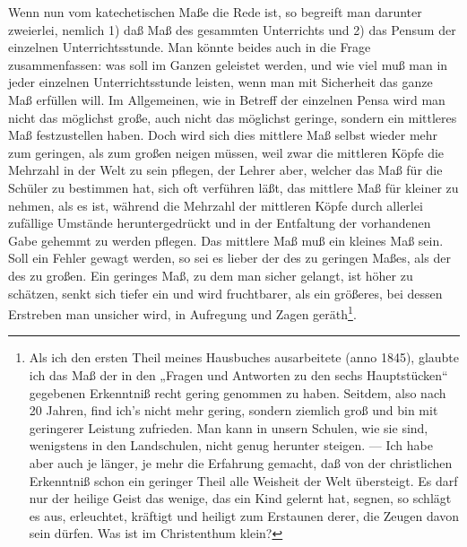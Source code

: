 Wenn nun vom katechetischen Maße die Rede ist, so begreift man darunter zweierlei, nemlich 1) daß Maß des gesammten Unterrichts und 2) das Pensum der einzelnen Unterrichtsstunde. Man könnte beides auch in die Frage zusammenfassen: was soll im Ganzen geleistet werden, und wie viel muß man in jeder einzelnen Unterrichtsstunde leisten, wenn man mit Sicherheit das ganze Maß erfüllen will. Im Allgemeinen, wie in Betreff der
einzelnen Pensa wird man nicht das möglichst große, auch nicht das möglichst geringe, sondern ein mittleres Maß festzustellen haben. Doch wird sich dies mittlere Maß selbst wieder mehr zum geringen, als zum großen neigen müssen, weil zwar die mittleren Köpfe die Mehrzahl in der Welt zu sein pflegen, der Lehrer aber, welcher das Maß für die Schüler zu bestimmen hat, sich oft verführen läßt, das mittlere Maß für kleiner zu nehmen, als es ist, während die Mehrzahl der mittleren Köpfe durch allerlei zufällige Umstände heruntergedrückt und in der Entfaltung der vorhandenen Gabe gehemmt zu werden pflegen. Das mittlere Maß muß ein kleines Maß sein. Soll ein Fehler gewagt werden, so sei es lieber der des zu geringen Maßes, als der des zu großen. Ein geringes Maß, zu dem man sicher gelangt, ist höher zu schätzen, senkt sich tiefer ein und wird fruchtbarer, als ein größeres, bei dessen Erstreben man unsicher wird, in Aufregung und Zagen geräth\footnote{Als ich den ersten Theil meines Hausbuches ausarbeitete (anno 1845), glaubte ich das Maß der in den „Fragen und Antworten zu den sechs Hauptstücken“ gegebenen Erkenntniß recht gering genommen zu haben. Seitdem, also nach 20 Jahren, find ich’s nicht mehr gering, sondern ziemlich groß und bin mit geringerer Leistung zufrieden. Man kann in unsern Schulen, wie sie sind, wenigstens in den Landschulen, nicht genug herunter steigen. — Ich habe aber auch je länger, je mehr die Erfahrung gemacht, daß von der christlichen Erkenntniß schon ein geringer Theil alle Weisheit der Welt übersteigt. Es darf nur der heilige Geist das wenige, das ein Kind gelernt hat, segnen, so schlägt es aus, erleuchtet, kräftigt und heiligt zum Erstaunen derer, die Zeugen davon sein dürfen. Was ist im Christenthum klein?}.

